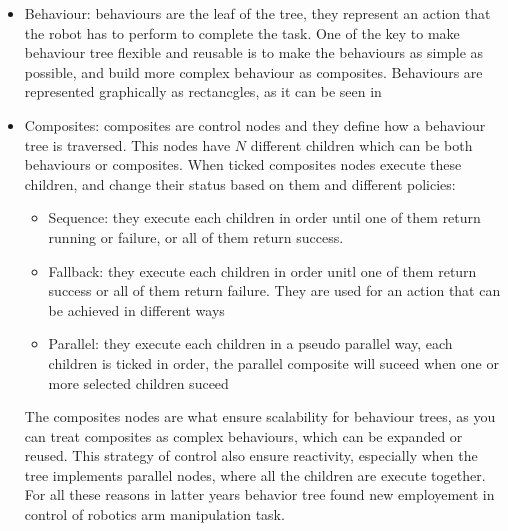 \begin{itemize}
  \item Behaviour: behaviours are the leaf of the tree, they represent an action that the robot has to perform 
                   to complete the task. One of the key to make behaviour tree flexible and reusable is to make the 
                   behaviours as simple as possible, and build more complex behaviour as composites. Behaviours are
                   represented graphically as rectancgles, as it can be seen in 
  \item Composites: composites are control nodes and they define how a behaviour tree is traversed. This nodes have 
                    $N$ different children which can be both behaviours or composites. When ticked composites nodes
                    execute these children, and change their status based on them and different policies:
                    \begin{itemize}
                      \item Sequence: they execute each children in order until one of them return running or failure, 
                                      or all of them return success.
                                    
                      \item Fallback: they execute each children in order unitl one of them return success or all 
                                      of them return failure. They are used for an action that can be achieved in 
                                      different ways
                                      
                      \item Parallel: they execute each children in a pseudo parallel way, each children is ticked in 
                                      order, the parallel composite will suceed when one or more selected children
                                      suceed
                                      
\end{itemize} 


The composites nodes are what ensure scalability for behaviour trees, as you can treat composites as complex behaviours,
which can be expanded or reused. This strategy of control also ensure reactivity, especially when the tree implements
parallel nodes, where all the children are execute together.
For all these reasons in latter years behavior tree found new employement in control of robotics arm manipulation task. 


\end{itemize}
